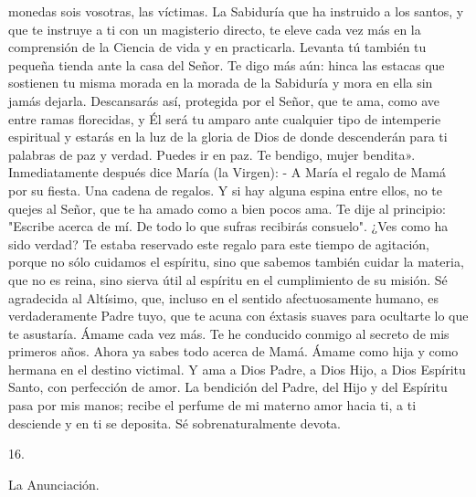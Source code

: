 \documentclass[12pt]{book} %
\begin{document}
monedas sois vosotras, las víctimas. 
La Sabiduría que ha instruido a los santos, y que te instruye a ti con un magisterio directo, te eleve cada vez más en la comprensión de la Ciencia de vida y en practicarla. Levanta tú también tu pequeña tienda ante la casa del Señor. Te digo más aún: hinca las estacas que sostienen tu misma morada en la morada de la Sabiduría y mora en ella sin jamás dejarla. Descansarás así, protegida por el Señor, que te ama, como ave entre ramas florecidas, y Él será tu amparo ante cualquier tipo de intemperie espiritual y estarás en la luz de la gloria de Dios de donde descenderán para ti palabras de paz y verdad. 
Puedes ir en paz. Te bendigo, mujer bendita». 
Inmediatamente después dice María (la Virgen): 
- A María el regalo de Mamá por su fiesta. Una cadena de regalos. Y si hay alguna espina entre ellos, no te quejes al Señor, que te ha amado como a bien pocos ama. 
Te dije al principio: "Escribe acerca de mí. De todo lo que sufras recibirás consuelo". ¿Ves como ha sido verdad? Te estaba reservado este regalo para este tiempo de agitación, porque no sólo cuidamos el espíritu, sino que sabemos también cuidar la materia, que no es reina, sino sierva útil al espíritu en el cumplimiento de su misión. 
Sé agradecida al Altísimo, que, incluso en el sentido afectuosamente humano, es verdaderamente Padre tuyo, que te 
acuna con éxtasis suaves para ocultarte lo que te asustaría. 
Ámame cada vez más. Te he conducido conmigo al secreto de mis primeros años. Ahora ya sabes todo acerca de Mamá. Ámame como hija y como hermana en el destino victimal. Y ama a Dios Padre, a Dios Hijo, a Dios Espíritu Santo, con perfección de amor. 
La bendición del Padre, del Hijo y del Espíritu pasa por mis manos; recibe el perfume de mi materno amor hacia ti, a ti 
desciende y en ti se deposita. Sé sobrenaturalmente devota. 
 
16. 
 
La Anunciación. 
 
\end{document}
